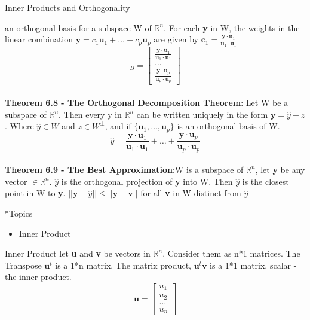 \documentclass[a4paper, 12pt]{article}
\begin{document}
\begin{section}{Inner Products and Orthogonality}
\begin{subsection}
an orthogonal basis for a subspace W of $\mathbb{R}^{n}$. For each \textbf{y} in 
W, the weights in the linear combination $\textbf{y}=c_1\textbf{u}_{1}+\ldots+
c_{p}\textbf{u}_{p}$ are given by $\textbf{c}_{1}=\frac{\textbf{y}\cdot
\textbf{u}_{1}}{\textbf{u}_{1}\cdot\textbf{u}_{1}}$
\begin{equation}
	[\textbf{y}]_{B}=\begin{bmatrix} \frac{\textbf{y}\cdot
\textbf{u}_{1}}{\textbf{u}_{1}\cdot\textbf{u}_{1}} \\ \dots \\
\frac{\textbf{y}\cdot \textbf{u}_{p}}{\textbf{u}_{p}\cdot\textbf{u}_{p}} 
\end{bmatrix} 
\end{equation}
\\ \noindent \textbf{Theorem 6.8 - The Orthogonal Decomposition Theorem}:
Let W be a subspace of $\mathbb{R}^{n}$. Then every y in $\mathbb{R}^{n}$ can be
written uniquely in the form $\textbf{y}=\hat{y} + z$. Where $\hat{y} \in W$ and 
$z \in W^{\perp}$, and if $\{\textbf{u}_{1},\ldots,\textbf{u}_{p}\}$ is an 
orthogonal basis of W. 
\begin{equation}
\hat{y}=\frac{\textbf{y}\cdot\textbf{u}_{1}}{\textbf{u}_{1}\cdot\textbf{u}_{1}}+
\dots +
\frac{\textbf{y}\cdot\textbf{u}_{p}}{\textbf{u}_{p}\cdot\textbf{u}_{p}}
\end{equation}
\\ \noindent \textbf{Theorem 6.9 - The Best Approximation}:W is a subspace of
$\mathbb{R}^{n}$, let \textbf{y} be any vector $\in \mathbb{R}^{n}$. $\hat{y}$ is
the orthogonal projection of \textbf{y} into W. Then $\hat{y}$ is the closest
point in  W to \textbf{y}. $||\textbf{y}-\hat{y}||\leq||\textbf{y}-\textbf{v}||$
for all \textbf{v} in W distinct from $\hat{y}$
\end{subsection}
\begin{subsection}*{Topics}
\begin{itemize}
\item{Inner Product}
\end{itemize}
\end{subsection}
\begin{subsection}{Inner Product}
let \textbf{u} and \textbf{v} be vectors in $\mathbb{R}^{n}$. Consider them as
n*1 matrices. The Transpose $\textbf{u}^{t}$ is a 1*n matrix. The matrix product,
$\textbf{u}^{t}\textbf{v}$ is a 1*1 matrix, scalar - the inner product. \\
\begin{equation}
\textbf{u}=\begin{bmatrix} u_1 \\ u_2 \\ \dots \\ u_{n} \end{bmatrix} 

\end{equation}
\end{subsection}
\end{section}
\end{document}
